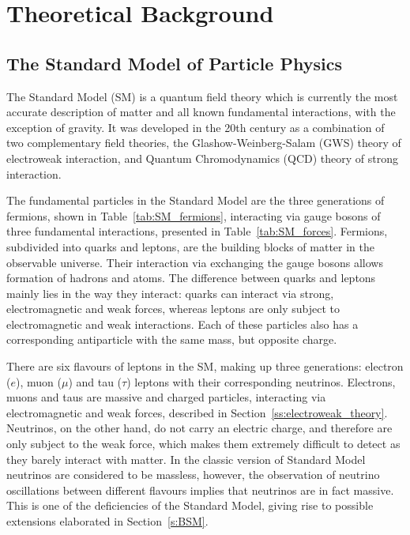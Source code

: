 
\chapter{Theoretical Background}
\label{c:theory}

\ifpdf
    \graphicspath{{02_Theory/plots/}}
\else
    \graphicspath{{02_Theory/plots/EPS/}{02_Theory/plots/}}
\fi

\section{The Standard Model of Particle Physics}
\label{s:SM}
The Standard Model (SM) is a quantum field theory which is currently the most accurate description of matter and all
known fundamental interactions, with the exception of gravity. It was developed in the 20th century as a combination of
two complementary field theories, the Glashow-Weinberg-Salam (GWS) \autocite{Glashow, Weinberg, Salam} theory of
electroweak interaction, and Quantum Chromodynamics (QCD) theory of strong interaction.

The fundamental particles in the Standard Model are the three generations of fermions, shown in
Table~\ref{tab:SM_fermions}, interacting via gauge bosons of three fundamental interactions, presented in
Table~\ref{tab:SM_forces}. Fermions, subdivided into quarks and leptons, are the building blocks of matter in the
observable universe. Their interaction via exchanging the gauge bosons allows formation of hadrons and atoms. The
difference between quarks and leptons mainly lies in the way they interact: quarks can interact via strong,
electromagnetic and weak forces, whereas leptons are only subject to electromagnetic and weak interactions. Each of
these particles also has a corresponding antiparticle with the same mass, but opposite charge.

There are six flavours of leptons in the SM, making up three generations: electron ($e$), muon ($\mu$) and tau ($\tau$)
leptons with their corresponding neutrinos. Electrons, muons and taus are massive and charged particles, interacting via
electromagnetic and weak forces, described in Section~\ref{ss:electroweak_theory}. Neutrinos, on the other hand, do not
carry an electric charge, and therefore are only subject to the weak force, which makes them extremely difficult to
detect as they barely interact with matter. In the classic version of Standard Model neutrinos are considered to be
massless, however, the observation of neutrino oscillations between different flavours \autocite{neutrino_oscillations}
implies that neutrinos are in fact massive. This is one of the deficiencies of the Standard Model, giving rise to
possible extensions elaborated in Section~\ref{s:BSM}.

